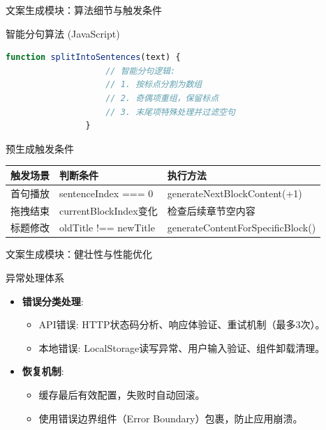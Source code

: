 \documentclass{beamer}
\begin{document}
	\begin{frame}[fragile]{文案生成模块：算法细节与触发条件}
		\begin{block}{智能分句算法 (JavaScript)}
			\begin{lstlisting}[language=JavaScript]
				function splitIntoSentences(text) {
					// 智能分句逻辑:
					// 1. 按标点分割为数组
					// 2. 奇偶项重组，保留标点
					// 3. 末尾项特殊处理并过滤空句
				}
			\end{lstlisting}
		\end{block}
		\begin{block}{预生成触发条件}
			\centering
			\small
			\begin{tabular}{|l|l|l|}
				\hline
				\textbf{触发场景} & \textbf{判断条件} & \textbf{执行方法} \\ %
				\hline
				首句播放 & sentenceIndex === 0 & generateNextBlockContent(+1) \\ %
				拖拽结束 & currentBlockIndex变化 & 检查后续章节空内容 \\ %
				标题修改 & oldTitle !== newTitle & generateContentForSpecificBlock() \\ %
				\hline
			\end{tabular}
		\end{block}
	\end{frame}
	
	
	
	\begin{frame}{文案生成模块：健壮性与性能优化}
		\begin{block}{异常处理体系}
			\begin{itemize}
				\item \textbf{错误分类处理}:
				\begin{itemize}
					\item API错误: HTTP状态码分析、响应体验证、重试机制（最多3次）。
					\item 本地错误: LocalStorage读写异常、用户输入验证、组件卸载清理。
				\end{itemize}
				\item \textbf{恢复机制}:
				\begin{itemize}
					\item 缓存最后有效配置，失败时自动回滚。
					\item 使用错误边界组件（Error Boundary）包裹，防止应用崩溃。
				\end{itemize}
			\end{itemize}
		\end{block}
	\end{frame}
	
\end{document}
